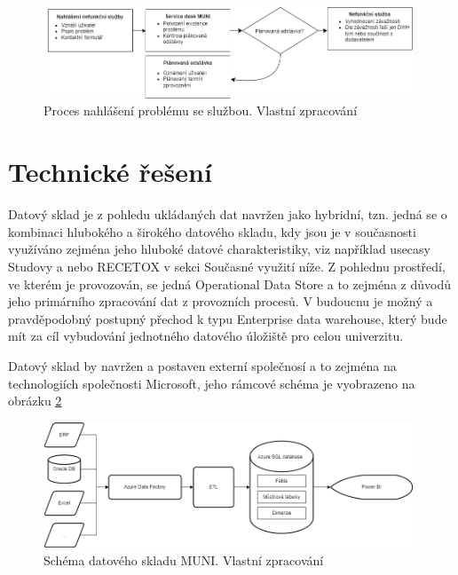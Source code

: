\documentclass[
  digital,     %
  twoside,     %
  lof,         %
  lot,         %
]{fithesis4}
\begin{document}
    \begin{figure}[t]
        \begin{center}
            \includegraphics[width=11cm]{img/service_failure_process.png}
        \end{center}
        \caption{Proces nahlášení problému se službou. Vlastní zpracování}
        \label{fig:service_fail}
    \end{figure} 
    
\section{Technické řešení}
Datový sklad je z pohledu ukládaných dat navržen jako hybridní, tzn. jedná se o kombinaci hlubokého a širokého datového skladu, kdy jsou je v současnosti využíváno zejména jeho hluboké datové charakteristiky, viz například usecasy Studovy a nebo RECETOX v sekci Současné využití níže. Z pohlednu prostředí, ve kterém je provozován, se jedná Operational Data Store a to zejména z důvodů jeho primárního zpracování dat z provozních procesů. V budoucnu je možný a pravděpodobný postupný přechod k typu Enterprise data warehouse, který bude mít za cíl vybudování jednotného datového úložiště pro celou univerzitu.

Datový sklad by navržen a postaven externí společnosí a to zejména na technologiích společnosti Microsoft, jeho rámcové schéma je vyobrazeno na obrázku \ref{fig:dwh_muni}

    \begin{figure}[t]
        \begin{center}
            \includegraphics[width=11cm]{img/dwh_muni.png}
        \end{center}
        \caption{Schéma datového skladu MUNI. Vlastní zpracování}
        \label{fig:dwh_muni}
    \end{figure} 
    
\end{document}
